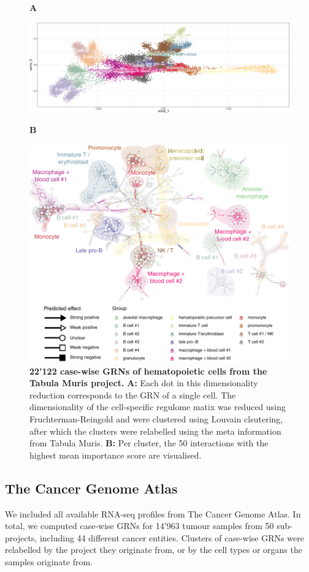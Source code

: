\begin{figure}[htb!]
	{\raggedright\textbf{A}}
	\begin{center}\includegraphics[width=\linewidth]{fig/tabula_muris_hema/plot_fr_cropped.png}\end{center}
	{\raggedright\textbf{B}}
	\begin{center}\includegraphics[width=.9\linewidth]{fig/tabula_muris_hema/grouped_interactions.pdf}\end{center}
	\caption{
		\textbf{22'122 case-wise GRNs of hematopoietic cells from the Tabula Muris project.}
		\textbf{A:} Each dot in this dimensionality reduction corresponds to the GRN of a single cell. The dimensionality of the cell-specific regulome matix was reduced using Fruchterman-Reingold and were clustered using Louvain clsutering, after which the clusters were relabelled using the meta information from Tabula Muris.
		\textbf{B:} Per cluster, the 50 interactions with the highest mean importance score are visualised.
	}
	\label{fig:tabmur}
\end{figure}

\subsection{The Cancer Genome Atlas}
We included all available RNA-seq profiles from The Cancer Genome Atlas. In total, we computed case-wise GRNs for 14'963 tumour samples from 50 sub-projects, including 44 different cancer entities. Clusters of case-wise GRNs were relabelled by the project they originate from, or by the cell types or organs the samples originate from. 

